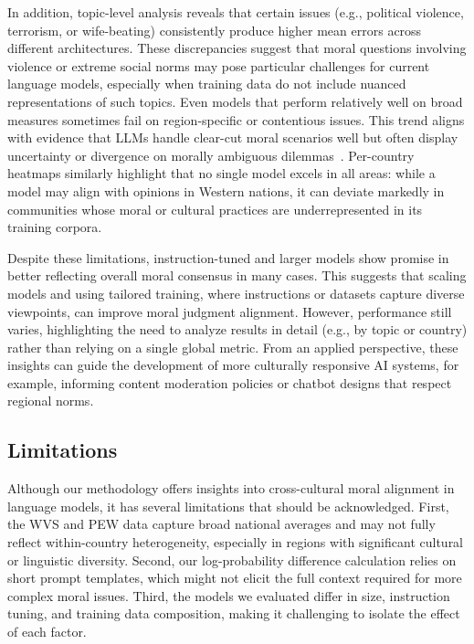 \documentclass[11pt]{article}
\begin{document}
In addition, topic-level analysis reveals that certain issues (e.g., political violence, terrorism, or wife-beating) consistently produce higher mean errors across different architectures. These discrepancies suggest that moral questions involving violence or extreme social norms may pose particular challenges for current language models, especially when training data do not include nuanced representations of such topics. Even models that perform relatively well on broad measures sometimes fail on region-specific or contentious issues. This trend aligns with evidence that LLMs handle clear-cut moral scenarios well but often display uncertainty or divergence on morally ambiguous dilemmas~\citep{scherrer2023evaluating}. Per-country heatmaps similarly highlight that no single model excels in all areas: while a model may align with opinions in Western nations, it can deviate markedly in communities whose moral or cultural practices are underrepresented in its training corpora.

Despite these limitations, instruction-tuned and larger models show promise in better reflecting overall moral consensus in many cases. This suggests that scaling models and using tailored training, where instructions or datasets capture diverse viewpoints, can improve moral judgment alignment. However, performance still varies, highlighting the need to analyze results in detail (e.g., by topic or country) rather than relying on a single global metric. From an applied perspective, these insights can guide the development of more culturally responsive AI systems, for example, informing content moderation policies or chatbot designs that respect regional norms.

\subsection{Limitations}
\label{sec:limitations}

Although our methodology offers insights into cross-cultural moral alignment in language models, it has several limitations that should be acknowledged. First, the WVS and PEW data capture broad national averages and may not fully reflect within-country heterogeneity, especially in regions with significant cultural or linguistic diversity. Second, our log-probability difference calculation relies on short prompt templates, which might not elicit the full context required for more complex moral issues. Third, the models we evaluated differ in size, instruction tuning, and training data composition, making it challenging to isolate the effect of each factor.
\end{document}
